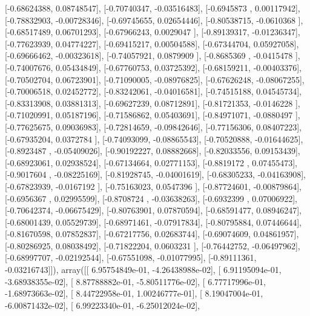 \documentclass{article}
\begin{document}
       [-0.68624388,  0.08748547],
       [-0.70740347, -0.03516483],
       [-0.6945873 ,  0.00117942],
       [-0.78832903, -0.00728346],
       [-0.69745655,  0.02654446],
       [-0.80538715, -0.0610368 ],
       [-0.68517489,  0.06701293],
       [-0.67966243,  0.0029047 ],
       [-0.89139317, -0.01236347],
       [-0.77623939,  0.04774227],
       [-0.69415217,  0.00504588],
       [-0.67344704,  0.05927058],
       [-0.69666462, -0.00323618],
       [-0.74057921,  0.0879909 ],
       [-0.8685369 , -0.0415478 ],
       [-0.74007676,  0.05434849],
       [-0.67760753,  0.03725392],
       [-0.68159211, -0.00403376],
       [-0.70502704,  0.06723901],
       [-0.71090005, -0.08976825],
       [-0.67626248, -0.08067255],
       [-0.70006518,  0.02452772],
       [-0.83242061, -0.04016581],
       [-0.74515188,  0.04545734],
       [-0.83313908,  0.03881313],
       [-0.69627239,  0.08712891],
       [-0.81721353, -0.0146228 ],
       [-0.71020991,  0.05187196],
       [-0.71586862,  0.05403691],
       [-0.84971071, -0.0880497 ],
       [-0.77625675,  0.09036983],
       [-0.72814659, -0.09842646],
       [-0.77156306,  0.08407223],
       [-0.67935204,  0.0372784 ],
       [-0.74093099, -0.08865543],
       [-0.70520888, -0.01644625],
       [-0.8923487 , -0.05409026],
       [-0.90192227,  0.08882668],
       [-0.82033556,  0.09153439],
       [-0.68923061,  0.02938524],
       [-0.67134664,  0.02771153],
       [-0.8819172 ,  0.07455473],
       [-0.9017604 , -0.08225169],
       [-0.81928745, -0.04001619],
       [-0.68305233, -0.04163908],
       [-0.67823939, -0.0167192 ],
       [-0.75163023,  0.0547396 ],
       [-0.87724601, -0.00879864],
       [-0.6956367 ,  0.02995599],
       [-0.8708724 , -0.03638263],
       [-0.6932399 ,  0.07006922],
       [-0.70642374, -0.06675429],
       [-0.80763901,  0.07870594],
       [-0.68591477,  0.08946247],
       [-0.68001439,  0.05529739],
       [-0.68971461, -0.07917834],
       [-0.80795884,  0.07446644],
       [-0.81670598,  0.07852837],
       [-0.67217756,  0.02683744],
       [-0.69074609,  0.04861957],
       [-0.80286925,  0.08038492],
       [-0.71822204,  0.0603231 ],
       [-0.76442752, -0.06497962],
       [-0.68997707, -0.02192544],
       [-0.67551098, -0.01077995],
       [-0.89111361, -0.03216743]]), array([[  6.95754849e-01,  -4.26438988e-02],
       [  6.91195094e-01,  -3.68938355e-02],
       [  8.87788882e-01,  -5.80511776e-02],
       [  6.77717996e-01,  -1.68973663e-02],
       [  8.44722958e-01,   1.00246777e-01],
       [  8.19047004e-01,  -6.00871432e-02],
       [  6.99223340e-01,  -6.25012024e-02],
\end{document}
